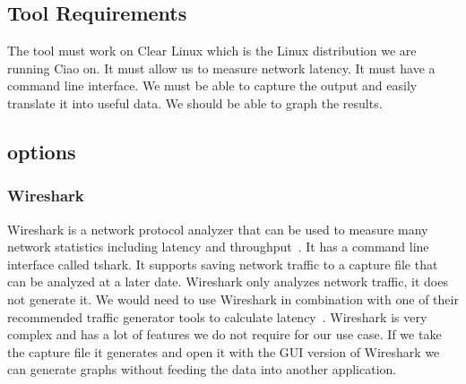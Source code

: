 \documentclass[10pt,letterpaper,onecolumn,draftclsnofoot]{IEEEtran}
\begin{document}
\subsection{Tool Requirements}
The tool must work on Clear Linux which is the Linux distribution we are running Ciao on.
It must allow us to measure network latency. 
It must have a command line interface.
We must be able to capture the output and easily translate it into useful data. 
We should be able to graph the results. 

\subsection{options}
\subsubsection{Wireshark}
Wireshark is a network protocol analyzer that can be used to measure many network statistics including latency and throughput~\cite{wireshark}. 
It has a command line interface called tshark.
It supports saving network traffic to a capture file that can be analyzed at a later date.
Wireshark only analyzes network traffic, it does not generate it.
We would need to use Wireshark in combination with one of their recommended traffic generator tools to calculate latency~\cite{wireshark-tools}.
Wireshark is very complex and has a lot of features we do not require for our use case.
If we take the capture file it generates and open it with the GUI version of Wireshark we can generate graphs without feeding the data into another application.
\end{document}
